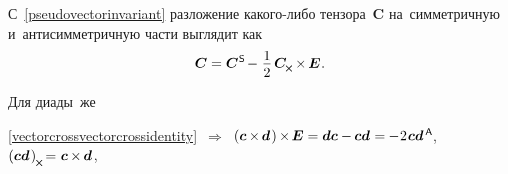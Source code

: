 \begin{otherlanguage}{russian}
С~\eqref{pseudovectorinvariant} разложение какого\hbox{-}либо тензора~$\bm{C}$ на~симметричную и~антисимметричную части выглядит как
\nopagebreak\vspace{.1em}\begin{equation}\label{symmetricantisymmetricdecompositionofsometensor}
\bm{C} = \bm{C}^{\mathsf{\hspace{0.1ex}S}} \hspace{-0.24ex} - \hspace{.12ex} \displaystyle \onehalf \hspace{.32ex} \bm{C}_{\hspace{-0.1ex}\Xcompanion} \hspace{-0.16ex} \times \hspace{-0.16ex} \bm{E} \hspace{0.1ex} .
\end{equation}

\vspace{-0.64em}\noindent Для диады~же

{\centering \eqref{vectorcrossvectorcrossidentity}~$\Rightarrow$~${\left( \bm{c} \hspace{-0.1ex} \times \hspace{-0.2ex} \bm{d} \hspace{.2ex} \right) \hspace{-0.12ex} \times \hspace{-0.25ex} \bm{E} = \bm{d} \bm{c} - \hspace{-0.1ex} \bm{c} \bm{d} \hspace{.1ex} = \hspace{-0.1ex} - \hspace{.1ex} 2 \hspace{.15ex} \bm{c}\bm{d}^{\mathsf{\hspace{.3ex}A}}\hspace{-0.2ex}}$,\hspace{.32em}
${\left( \bm{c} \bm{d} \hspace{.2ex} \right)_{\hspace{-0.15ex}\Xcompanion} \hspace{-0.32ex} =
\hspace{0.1ex} \bm{c} \hspace{-0.1ex} \times \hspace{-0.16ex} \bm{d} \hspace{.12ex}}$, \par}


\end{otherlanguage}
